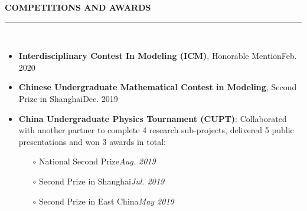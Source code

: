 \documentclass[letterpaper,11pt]{article}
\begin{document}
{\Large\bfseries{}COMPETITIONS AND AWARDS}\\
\rule[1.5ex]{\columnwidth}{1pt}\\
\vspace{-5ex}
\begin{itemize}
    \item {\bfseries{}Interdisciplinary Contest In Modeling (ICM)}, {Honorable Mention}\hfill{Feb. 2020}
    \item {\bfseries{}Chinese Undergraduate Mathematical Contest in Modeling}, {Second Prize in Shanghai}\hfill{Dec. 2019}
    \item {\bfseries{}China Undergraduate Physics Tournament (CUPT)}: Collaborated with another partner to complete 4 research sub-projects, delivered 5 public presentations and won 3 awards in total:
    \begin{itemize}
        \item[$\circ$] {National Second Prize}\hfill{\itshape{}Aug. 2019}
        \item[$\circ$] {Second Prize in Shanghai}\hfill{\itshape{}Jul. 2019}
        \item[$\circ$] {Second Prize in East China}\hfill{\itshape{}May 2019}
    \end{itemize}
\end{itemize}
\end{document}
